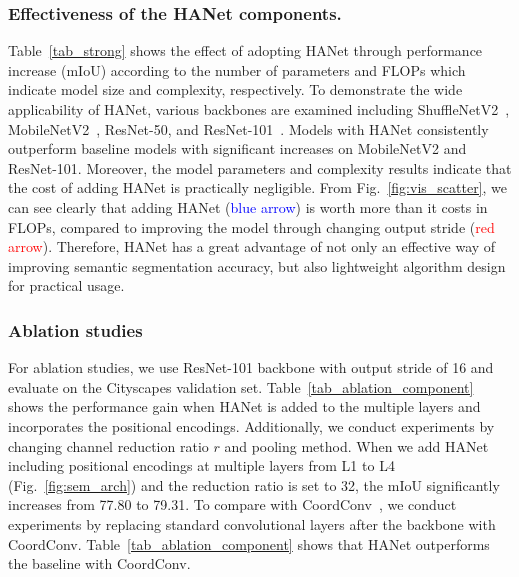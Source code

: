 \documentclass[10pt,twocolumn,letterpaper]{article}
\begin{document}
\vspace*{-0.3cm}
\subsubsection{Effectiveness of the HANet components.}
\vspace*{-0.1cm}
Table~\ref{tab_strong} shows the effect of adopting HANet through performance increase (mIoU) according to the number of parameters and FLOPs which indicate model size and complexity, respectively.
To demonstrate the wide applicability of HANet, various backbones are examined including ShuffleNetV2~\cite{ma2018shufflenet}, MobileNetV2~\cite{Sandler_2018}, ResNet-50, and ResNet-101~\cite{he2016deep}.
Models with HANet consistently outperform baseline models with significant increases on MobileNetV2 and ResNet-101.
Moreover, the model parameters and complexity results indicate that the cost of adding HANet is practically negligible.
From Fig.~\ref{fig:vis_scatter}, we can see clearly that adding HANet (\textcolor{blue}{blue arrow}) is worth more than it costs in FLOPs, compared to improving the model through changing output stride (\textcolor{red}{red arrow}).
Therefore, HANet has a great advantage of not only an effective way of improving semantic segmentation accuracy, but also lightweight algorithm design for practical usage.




\vspace*{-0.3cm}
\subsubsection{Ablation studies} \label{exp_abl}
\vspace*{-0.2cm}
For ablation studies, we use ResNet-101 backbone with output stride of 16 and evaluate on the Cityscapes validation set.
Table~\ref{tab_ablation_component} shows the performance gain when HANet is added to the multiple layers and incorporates the positional encodings. Additionally, we conduct experiments by changing channel reduction ratio $r$ and pooling method. When we add HANet including positional encodings at multiple layers from L1 to L4 (Fig.~\ref{fig:sem_arch}) and the reduction ratio is set to 32, the mIoU significantly increases from 77.80 to 79.31.
To compare with CoordConv~\cite{liu2018intriguing}, we conduct experiments by replacing standard convolutional layers after the backbone with CoordConv. Table~\ref{tab_ablation_component} shows that HANet outperforms the baseline with CoordConv.
\end{document}
